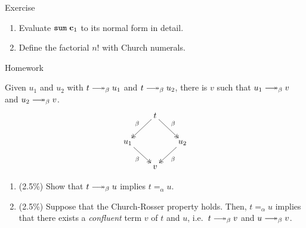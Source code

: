 
\begin{frame}{Exercise}
  \begin{enumerate}
    \item Evaluate $\mathtt{sum}\;\mathbf{c}_1$ to its normal form in detail.
    \item Define the factorial $n!$ with Church numerals.
  \end{enumerate}
\end{frame}

\begin{frame}{Homework}
  \begin{theorem}
    Given $u_1$ and $u_2$ with $t \reduce u_1$ and $t\reduce u_2$, there is $v$
    such that $u_1 \reduce v$ and $u_2 \reduce v$. 
    \[
      \xymatrix@-4.8pt{
        & t \ar@{->>}[rd]^{\beta} \ar@{->>}[ld]_{\beta} \\
        u_1 \ar@{->>}[rd]_{\beta} & & u_2 \ar@{->>}[ld]^{\beta} \\
        & v
      }
    \]
  \end{theorem}
  \begin{enumerate}
    \item (2.5\%) Show that $t \reduce u$ implies $t =_\alpha u$. 
    \item (2.5\%) Suppose that the Church-Rosser property holds.
      Then, $t =_\alpha u$ implies that there exists a \emph{confluent} term $v$ of $t$ and $u$, i.e.\ $t \reduce v$ and $u \reduce v$.
  \end{enumerate}
\end{frame}

